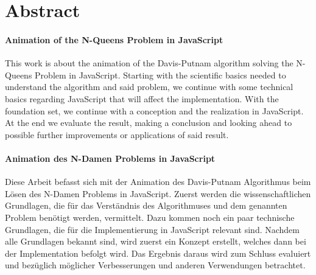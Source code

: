 
\chapter*{Abstract}
\subsubsection{Animation of the N-Queens Problem in JavaScript}
This work is about the animation of the Davis-Putnam algorithm solving the N-Queens Problem in JavaScript. Starting with the scientific basics needed to understand the algorithm and said problem, we continue with some technical basics regarding JavaScript that will affect the implementation. With the foundation set, we continue with a conception and the realization in JavaScript. At the end we evaluate the result, making a conclusion and looking ahead to possible further improvements or applications of said result.

\subsubsection{Animation des  N-Damen Problems in JavaScript}
Diese Arbeit befasst sich mit der Animation des Davis-Putnam Algorithmus beim Lösen des N-Damen Problems in JavaScript. Zuerst werden die wissenschaftlichen Grundlagen, die für das Verständnis des Algorithmuses und dem genannten Problem benötigt werden, vermittelt. Dazu kommen noch ein paar technische Grundlagen, die für die Implementierung in JavaScript relevant sind. Nachdem alle Grundlagen bekannt sind, wird zuerst ein Konzept erstellt, welches dann bei der Implementation befolgt wird. Das Ergebnis daraus wird zum Schluss evaluiert und bezüglich möglicher Verbesserungen und anderen Verwendungen betrachtet.